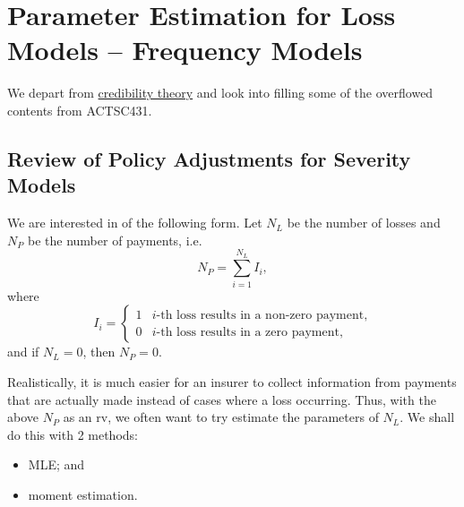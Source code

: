 \documentclass[notoc,notitlepage]{tufte-book}
\begin{document}


\label{part:parametric_statistical_methods}

\chapter{Parameter Estimation for Loss Models -- Frequency Models}%
\label{chp:parameter_estimation_for_loss_models_frequency_models}


We depart from \hyperref[part:credibility_theory]{credibility theory}
and look into filling some of the overflowed contents from ACTSC431.

\section{Review of Policy Adjustments for Severity Models}%
\label{sec:review_of_policy_adjustments_for_severity_models}

We are interested in  of the following form.
Let $N_L$ be the number of losses and $N_P$ be the number of payments, i.e.
\begin{equation*}
  N_P = \sum_{i=1}^{N_L} I_i,
\end{equation*}
where
\begin{equation*}
  I_i = \begin{cases}
    1 & i\text{-th loss results in a non-zero payment,} \\
    0 & i\text{-th loss results in a zero payment,}
  \end{cases}
\end{equation*}
and if $N_L = 0$, then $N_P = 0$.

Realistically, it is much easier for an insurer to collect information
from payments that are actually made instead of cases where a loss occurring.
Thus, with the above $N_P$ as an rv, we often want to try estimate
the parameters of $N_L$. We shall do this with 2 methods:
\begin{itemize}
  \item MLE; and
  \item moment estimation.
\end{itemize}
\end{document}
